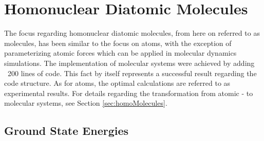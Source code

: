 \section{Homonuclear Diatomic Molecules}

The focus regarding homonuclear diatomic molecules, from here on referred to as molecules, has been similar to the focus on atoms, with the exception of parameterizing atomic forces which can be applied in molecular dynamics simulations. The implementation of molecular systems were achieved by adding ~200 lines of code. This fact by itself represents a successful result regarding the code structure. As for atoms, the optimal calculations are referred to as experimental results. For details regarding the transformation from atomic - to molecular systems, see Section \ref{sec:homoMolecules}.

\subsection{Ground State Energies}
 
